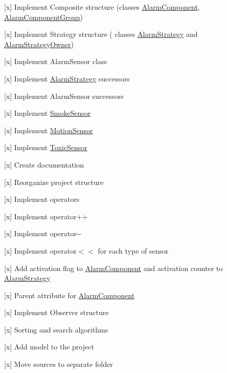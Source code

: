\begin{DoxyItemize}
\item \mbox{[}x\mbox{]} Implement Composite structure (classes \hyperlink{classAlarmComponent}{Alarm\+Component}, \hyperlink{classAlarmComponentGroup}{Alarm\+Component\+Group})
\item \mbox{[}x\mbox{]} Implement Strategy structure ( classes \hyperlink{classAlarmStrategy}{Alarm\+Strategy} and \hyperlink{classAlarmStrategyOwner}{Alarm\+Strategy\+Owner})
\item \mbox{[}x\mbox{]} Implement Alarm\+Sensor class
\item \mbox{[}x\mbox{]} Implement \hyperlink{classAlarmStrategy}{Alarm\+Strategy} successors
\item \mbox{[}x\mbox{]} Implement Alarm\+Sensor successors
\begin{DoxyItemize}
\item \mbox{[}x\mbox{]} Implement \hyperlink{classSmokeSensor}{Smoke\+Sensor}
\item \mbox{[}x\mbox{]} Implement \hyperlink{classMotionSensor}{Motion\+Sensor}
\item \mbox{[}x\mbox{]} Implement \hyperlink{classToxicSensor}{Toxic\+Sensor}
\end{DoxyItemize}
\item \mbox{[}x\mbox{]} Create documentation
\item \mbox{[}x\mbox{]} Reorganize project structure
\item \mbox{[}x\mbox{]} Implement operators
\begin{DoxyItemize}
\item \mbox{[}x\mbox{]} Implement operator++
\item \mbox{[}x\mbox{]} Implement operator-\/-\/
\item \mbox{[}x\mbox{]} Implement operator$<$$<$ for each type of sensor
\end{DoxyItemize}
\item \mbox{[}x\mbox{]} Add activation flag to \hyperlink{classAlarmComponent}{Alarm\+Component} and activation counter to \hyperlink{classAlarmStrategy}{Alarm\+Strategy}
\item \mbox{[}x\mbox{]} Parent attribute for \hyperlink{classAlarmComponent}{Alarm\+Component}
\item \mbox{[}x\mbox{]} Implement Observer structure
\item \mbox{[}x\mbox{]} Sorting and search algorithms
\item \mbox{[}x\mbox{]} Add model to the project
\item \mbox{[}x\mbox{]} Move sources to separate folder 
\end{DoxyItemize}